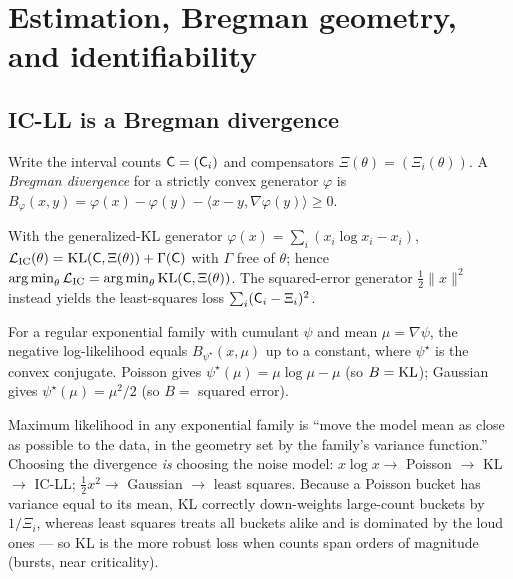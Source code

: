 \section{Estimation, Bregman geometry, and identifiability}
\label{app:estimation}

\subsection{IC-LL is a Bregman divergence}

Write the interval counts $\mathsf{C}=(\mathsf{C}_i)$ and compensators
$\Xi(\theta)=(\Xi_i(\theta))$. A \emph{Bregman divergence} for a strictly convex
generator $\varphi$ is
$B_\varphi(x,y)=\varphi(x)-\varphi(y)-\langle x-y,\nabla\varphi(y)\rangle\ge0$.

\begin{proposition}\label{prop:kl}
With the generalized-KL generator $\varphi(x)=\sum_i(x_i\log x_i-x_i)$,
$\mathcal L_{\mathrm{IC}}(\theta)=\operatorname{KL}(\mathsf{C},\Xi(\theta))+\Gamma(\mathsf{C})$ with
$\Gamma$ free of $\theta$; hence
$\operatorname*{arg\,min}_\theta\mathcal L_{\mathrm{IC}}=\operatorname*{arg\,min}_\theta\operatorname{KL}(\mathsf{C},\Xi(\theta))$.
The squared-error generator $\tfrac12\|x\|^2$ instead yields the least-squares loss
$\sum_i(\mathsf{C}_i-\Xi_i)^2$.
\end{proposition}

\begin{theorem}
For a regular exponential family with cumulant $\psi$ and mean $\mu=\nabla\psi$, the
negative log-likelihood equals $B_{\psi^\star}(x,\mu)$ up to a constant, where
$\psi^\star$ is the convex conjugate. Poisson gives $\psi^\star(\mu)=\mu\log\mu-\mu$
(so $B=\operatorname{KL}$); Gaussian gives $\psi^\star(\mu)=\mu^2/2$ (so $B=$ squared error).
\end{theorem}

\begin{intuition}
Maximum likelihood in any exponential family is ``move the model mean as close as
possible to the data, in the geometry set by the family's variance function.''
Choosing the divergence \emph{is} choosing the noise model: $x\log x\to$ Poisson
$\to$ KL $\to$ IC-LL; $\tfrac12x^2\to$ Gaussian $\to$ least squares. Because a
Poisson bucket has variance equal to its mean, KL correctly down-weights
large-count buckets by $1/\Xi_i$, whereas least squares treats all buckets alike
and is dominated by the loud ones --- so KL is the more robust loss when counts span
orders of magnitude (bursts, near criticality).
\end{intuition}

